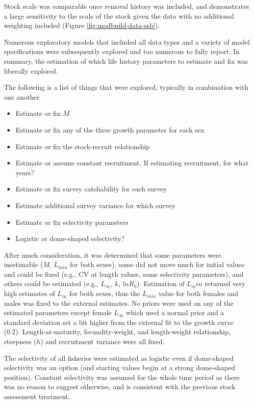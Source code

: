 \documentclass[11pt,
  english,
  letterpaper,
]{article}
\providecommand{\tightlist}{%
  \setlength{\itemsep}{0pt}\setlength{\parskip}{0pt}}
\providecommand{\tightlist}{%
  \setlength{\itemsep}{0pt}\setlength{\parskip}{0pt}}
\begin{document}
Stock scale was comparable once removal history was included, and demonstrates a large sensitivity to the scale of the stock given the data with no additional weighting included (Figure \ref{fig:modbuild-data-ssb}).

Numerous exploratory models that included all data types and a variety of model specifications were subsequently explored and too numerous to fully report. In summary, the estimation of which life history parameters to estimate and fix was liberally explored.

The following is a list of things that were explored, typically in combination with one another

\begin{itemize}
\tightlist
\item
  Estimate or fix \(M\)
\item
  Estimate or fix any of the three growth parameter for each sex
\item
  Estimate or fix the stock-recruit relationship
\item
  Estimate or assume constant recruitment. If estimating recruitment, for what years?
\item
  Estimate or fix survey catchability for each survey
\item
  Estimate additional survey variance for which survey
\item
  Estimate or fix selectivity parameters
\item
  Logistic or dome-shaped selectivity?
\end{itemize}

After much consideration, it was determined that some parameters were inestimable (\(M\), \(L_{min}\) for both sexes), some did not move much for initial values and could be fixed (e.g., CV at length values, some selectivity parameters), and others could be estimated (e.g., \(L_{\infty}\), \(k\), \(lnR_0\)). Estimation of \(L_min\) returned very high estimates of \(L_{\infty}\) for both sexes, thus the \(L_{min}\) value for both females and males was fixed to the external estimates. No priors were used on any of the estimated parameters except female \(L_{\infty}\) which used a normal prior and a standard deviation set a bit higher from the external fit to the growth curve (0.2). Length-at-maturity, fecundity-weight, and length-weight relationship, steepness (\(h\)) and recruitment variance were all fixed.

The selectivity of all fisheries were estimated as logistic even if dome-shaped selectivity was an option (and starting values begin at a strong dome-shaped position). Constant selectivity was assumed for the whole time period as there was no reason to suggest otherwise, and is consistent with the previous stock assessment treatment.
\end{document}
